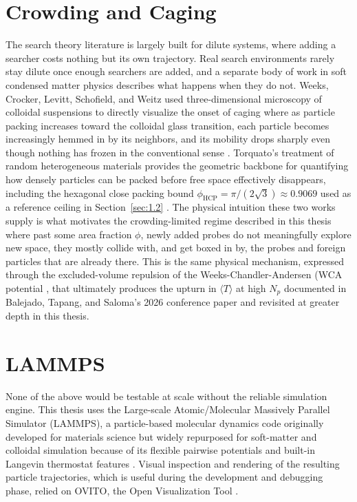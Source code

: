 \section{Crowding and Caging}
\label{sec:2.4}
\hspace{\parindent} The search theory literature is largely built for dilute systems, where adding a searcher costs nothing but its own trajectory. Real search environments rarely stay dilute once enough searchers are added, and a separate body of work in soft condensed matter physics describes what happens when they do not. Weeks, Crocker, Levitt, Schofield, and Weitz used three-dimensional microscopy of colloidal suspensions to directly visualize the onset of caging where as particle packing increases toward the colloidal glass transition, each particle becomes increasingly hemmed in by its neighbors, and its mobility drops sharply even though nothing has frozen in the conventional sense \cite{Weeks2000}. Torquato's treatment of random heterogeneous materials provides the geometric backbone for quantifying how densely particles can be packed before free space effectively disappears, including the hexagonal close packing bound $\phi_\text{HCP} = \pi/(2\sqrt{3}) \approx 0.9069$ used as a reference ceiling in Section~\ref{sec:1.2} \cite{Torquato2002}. The physical intuition these two works supply is what motivates the crowding-limited regime described in this thesis where past some area fraction $\phi$, newly added probes do not meaningfully explore new space, they mostly collide with, and get boxed in by, the probes and foreign particles that are already there. This is the same physical mechanism, expressed through the excluded-volume repulsion of the Weeks-Chandler-Andersen (WCA potential \cite{Weeks1971}, that ultimately produces the upturn in $\langle T \rangle$ at high $N_p$ documented in Balejado, Tapang, and Saloma's 2026 conference paper \cite{Balejado2026} and revisited at greater depth in this thesis. 

\section{LAMMPS}
\label{sec:2.5}
\hspace{\parindent} None of the above would be testable at scale without the reliable simulation engine. This thesis uses the Large-scale Atomic/Molecular Massively Parallel Simulator (LAMMPS), a particle-based molecular dynamics code originally developed for materials science but widely repurposed for soft-matter and colloidal simulation because of its flexible pairwise potentials and built-in Langevin thermostat features \cite{Thompson2022}. Visual inspection and rendering of the resulting particle trajectories, which is useful during the development and debugging phase, relied on OVITO, the Open Visualization Tool \cite{Stukowski2010}.

